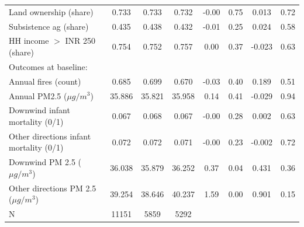\begin{center}
{\begin{tabular}{l c c c c c c c}
\hline                                                               
Land ownership (share)             & 0.733         & 0.733         & 0.732         & -0.00         & 0.75         & 0.013         & 0.72         \\
Subsistence ag (share)             & 0.435 & 0.438 & 0.432 & -0.01 & 0.25 & 0.024 & 0.58 \\
HH income $>$ INR 250 (share)      & 0.754          & 0.752          & 0.757          & 0.00          & 0.37          & -0.023          & 0.63          \\
\hline  
Outcomes at baseline:      &           &           &          &           &           &          &          \\ 
Annual fires (count)      & 0.685          & 0.699          & 0.670          & -0.03          & 0.40          & 0.189          & 0.51          \\
Annual PM2.5 ($\mu g/m^{3}$)      & 35.886          & 35.821          & 35.958          & 0.14          & 0.41          & -0.029          & 0.94          \\
Downwind infant mortality (0/1)     & 0.067          & 0.068          & 0.067          & -0.00          & 0.28          & 0.002          & 0.63          \\
Other directions infant mortality (0/1)    & 0.072          & 0.072          & 0.071          & -0.00          & 0.23          & -0.002          & 0.72          \\
Downwind PM 2.5 ($\mu g/m^{3}$)   & 36.038          & 35.879          & 36.252          & 0.37          & 0.04          & 0.431          & 0.36          \\
Other directions PM 2.5 ($\mu g/m^{3}$)   & 39.254          & 38.646          & 40.237          & 1.59          & 0.00          & 0.901          & 0.15          \\
\hline                                                                  
N                                  & 11151                        & 5859                        & 5292                        &                                 &                                 &                                 &                                  \\
\hline 
\end{tabular} }  
\end{center}

